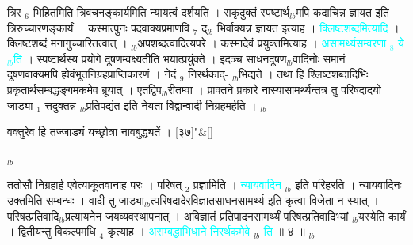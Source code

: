 \documentclass[article,12pt,a4paper]{memoir}%
\newcommand{\quotelemma}[1]{\textcolor{cyan}{#1}}
\newcounter{parCount}
\begin{document}
	  
	  \pstart \leavevmode%
	त्रिर {\tiny $_{6}$} भिहितमिति त्रिवचनङ्कार्यमिति न्यायत्वं दर्शयति । सकृदुक्तं स्पष्टार्थ{\tiny $_{lb}$}मपि कदाचिन्न ज्ञायत इति त्रिरुच्चारणङ्कार्यं । कस्मात्पुनः पदवाक्यप्रमाणवि {\tiny $_{7}$} द्{\tiny $_{lb}$}\leavevmode{} भिर्वाक्यन्न ज्ञायत इत्याह । \quotelemma{क्लिष्टशब्दमित्यादि} । क्लिष्टशब्दं मनागुच्चारितत्वात् । {\tiny $_{lb}$}अपशब्दत्वादित्यपरे । कस्मादेवं प्रयुक्तमित्याह । \quotelemma{असामर्थ्यसम्वरणा {\tiny $_{8}$} ये \cite[13b9]{vn-msN} {\tiny $_{lb}$}ति} । स्पष्टार्थस्य प्रयोगे दूषणम्वक्ष्यतीति भयात्प्रयुंक्ते । इदञ्च साधनदूषण{\tiny $_{lb}$}वादिनोः समानं । दूषणवाक्यमपि ह्येवंभूतनिग्रहप्राप्तिकारणं । नेदं {\tiny $_{9}$} \leavevmode{} निरर्थकाद्- {\tiny $_{lb}$}भिद्यते । तथा हि श्लिष्टशब्दादिभिः प्रकृतार्थसम्बद्धङ्गमकमेव ब्रूयात् । एतद्विप{\tiny $_{lb}$}रीतम्वा । प्राक्तने प्रकारे नास्यासामर्थ्यन्तत्र तु परिषदादयो जाड्या {\tiny $_{1}$} त्तदुक्तन्न {\tiny $_{lb}$}प्रतिपद्यंत इति नेयता विद्वान्वादी निग्रहमर्हति ।
	{}
	\pend%
      {\tiny $_{lb}$}
	  \bigskip
	  \begingroup
	
	    
	    \stanza[\smallbreak]
	  वक्तुरेव हि तज्जाड्यं यच्छ्रोत्रा नावबुद्ध्यतें । [३७]{\normalfontlatin\large\qquad{}"}\&[\smallbreak]
	  
	  
	  
	  \endgroup
	{\tiny $_{lb}$}

	  
	  \pstart \leavevmode%
	ततोसौ निग्रहार्ह एवेत्याकूतवानाह परः । परिषत् {\tiny $_{2}$} प्रज्ञामिति । \quotelemma{न्यायवादिन} {\tiny $_{lb}$} \cite[13b9]{vn-msN} इति परिहरति । न्यायवादिनः उक्तमिति सम्बन्धः । वादी तु जाड्या{\tiny $_{lb}$}त्परिषदादेरविज्ञातसाधनसामर्थ्य इति कृत्वा विजेता न स्यात् । परिषत्प्रतिवादि{\tiny $_{lb}$}प्रत्यायनेन जयव्यवस्थापनात् । अविज्ञातं प्रतिपादनसामर्थ्यं परिषत्प्रतिवादिभ्यां {\tiny $_{lb}$}यस्येति कार्यं । द्वितीयन्तु विकल्पमधि {\tiny $_{4}$} कृत्याह । \quotelemma{असम्बद्धाभिधाने निरर्थकमेवे} {\tiny $_{lb}$} \cite[14a1]{vn-msN} \quotelemma{ति} ॥ ४ ॥
	{}
	\pend%
      {\tiny $_{lb}$}
\end{document}
